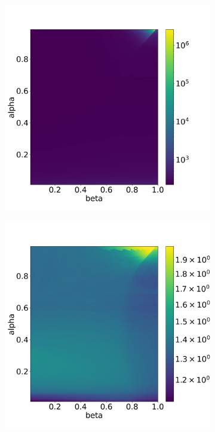 \begin{figure}[H]
    \centering
    \begin{subfigure}{0.32\textwidth}
    	\centering
    	\includegraphics[width=1\textwidth]{images/analysis_BDF12_TS.png}
        \label{fig:numberTimeStepsBDF12}
    \end{subfigure}
    \begin{subfigure}{0.32\textwidth}
    	\centering
    	\includegraphics[width=1\textwidth]{images/analysis_BDF12_NI.png}

\end{subfigure}
\end{figure}
